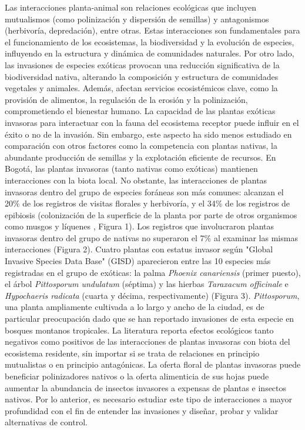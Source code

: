 \documentclass{article}
\begin{document}
			
Las interacciones planta-animal son relaciones ecológicas que incluyen mutualismos (como polinización y dispersión de semillas) y antagonismos (herbivoría, depredación), entre otras. Estas interacciones son fundamentales para el funcionamiento de los ecosistemas, la biodiversidad y la evolución de especies, influyendo en la estructura y dinámica de comunidades naturales. Por otro lado, las invasiones de especies exóticas provocan una reducción significativa de la biodiversidad nativa, alterando la composición y estructura de comunidades vegetales y animales. Además, afectan servicios ecosistémicos clave, como la provisión de alimentos, la regulación de la erosión y la polinización, comprometiendo el bienestar humano. La capacidad de las plantas exóticas invasoras para interactuar con la fauna del ecosistema receptor puede influir en el éxito o no de la invasión. Sin embargo, este aspecto ha sido menos estudiado en comparación con otros factores como la competencia con plantas nativas, la abundante producción de semillas y la explotación eficiente de recursos. En Bogotá, las plantas invasoras (tanto nativas como exóticas) mantienen interacciones con la biota local. No obstante, las interacciones de plantas invasoras dentro del grupo de especies foráneas son más comunes: alcanzan el 20\% de los registros de visitas florales y herbivoría, y el 34\% de los registros de epibiosis (colonización de la superficie de la planta por parte de otros organismos como musgos y líquenes , Figura 1). Los registros que involucraron plantas invasoras dentro del grupo de nativas no superaron el 7\% al examinar las mismas interacciones (Figura 2). Cuatro plantas con estatus invasor según "Global Invasive Species Data Base" (GISD) aparecieron entre las 10 especies más registradas en el grupo de exóticas: la palma \textit{Phoenix canariensis} (primer puesto), el árbol \textit{Pittosporum undulatum} (séptima) y las hierbas \textit{Taraxacum officinale} e \textit{Hypochaeris radicata} (cuarta y décima, respectivamente) (Figura 3). \textit{Pittosporum}, una planta ampliamente cultivada a lo largo y ancho de la ciudad, es de particular preocupación dado que se han reportado invasiones de esta especie en bosques montanos tropicales. La literatura reporta efectos ecológicos tanto negativos como positivos de las interacciones de plantas invasoras con biota del ecosistema residente, sin importar si se trata de relaciones en principio mutualistas o en principio antagónicas. La oferta floral de plantas invasoras puede beneficiar polinizadores nativos o la oferta alimenticia de sus hojas puede aumentar la abundancia de insectos invasores a expensas de plantas e insectos nativos. Por lo anterior, es necesario estudiar este tipo de interacciones a mayor profundidad con el fin de entender las invasiones y diseñar, probar y validar alternativas de control.
\end{document}
